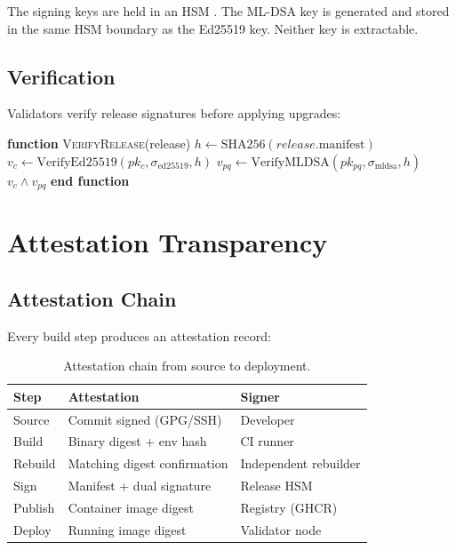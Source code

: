 \documentclass[11pt]{article}
\begin{document}
The signing keys are held in an HSM \cite{hsm-boundary}. The ML-DSA key is generated and stored in the same HSM boundary as the Ed25519 key. Neither key is extractable.

\subsection{Verification}

Validators verify release signatures before applying upgrades:

\begin{algorithmic}[1]
\State \textbf{function} \textsc{VerifyRelease}(release)
\State $h \gets \text{SHA256}(release.\text{manifest})$
\State $v_c \gets \text{VerifyEd25519}(pk_c, \sigma_{\text{ed25519}}, h)$
\State $v_{pq} \gets \text{VerifyMLDSA}(pk_{pq}, \sigma_{\text{mldsa}}, h)$
\State \Return $v_c \land v_{pq}$
\State \textbf{end function}
\end{algorithmic}

\section{Attestation Transparency}

\subsection{Attestation Chain}

Every build step produces an attestation record:

\begin{table}[h]
\centering
\small
\begin{tabular}{@{}lll@{}}
\toprule
\textbf{Step} & \textbf{Attestation} & \textbf{Signer} \\
\midrule
Source & Commit signed (GPG/SSH) & Developer \\
Build & Binary digest + env hash & CI runner \\
Rebuild & Matching digest confirmation & Independent rebuilder \\
Sign & Manifest + dual signature & Release HSM \\
Publish & Container image digest & Registry (GHCR) \\
Deploy & Running image digest & Validator node \\
\bottomrule
\end{tabular}
\caption{Attestation chain from source to deployment.}
\label{tab:attestation}
\end{table}
\end{document}
